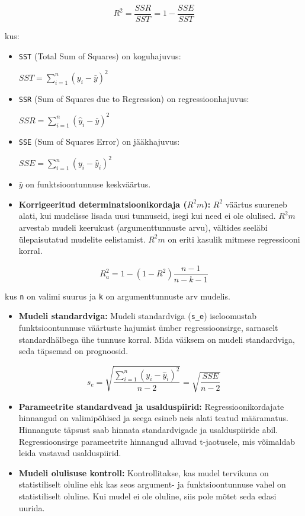 \documentclass[
]{book}
\providecommand{\tightlist}{%
  \setlength{\itemsep}{0pt}\setlength{\parskip}{0pt}}
\theoremstyle{definition}
\theoremstyle{definition}
\theoremstyle{definition}
\theoremstyle{definition}
\theoremstyle{remark}
\begin{document}
\[R^2 = \frac{SSR}{SST} = 1 - \frac{SSE}{SST}\]

kus:

\begin{itemize}
\item
  \texttt{SST} (Total Sum of Squares) on koguhajuvus:

  \(SST = \sum_{i=1}^{n}(y_i - \bar{y})^2\)
\item
  \texttt{SSR} (Sum of Squares due to Regression) on regressioonhajuvus:

  \(SSR = \sum_{i=1}^{n}(\hat{y}_i - \bar{y})^2\)
\item
  \texttt{SSE} (Sum of Squares Error) on jääkhajuvus:

  \(SSE = \sum_{i=1}^{n}(y_i - \hat{y}_i)^2\)
\item
  \(\bar{y}\) on funktsioontunnuse keskväärtus.
\item
  \textbf{Korrigeeritud determinatsioonikordaja (\(R^2m\)):} \(R^2\) väärtus suureneb alati, kui mudelisse lisada uusi tunnuseid, isegi kui need ei ole olulised. \(R^2m\) arvestab mudeli keerukust (argumenttunnuste arvu), vältides seeläbi ülepaisutatud mudelite eelistamist. \(R^2m\) on eriti kasulik mitmese regressiooni korral.
\end{itemize}

\[R^2_a = 1 - (1-R^2) \frac{n-1}{n-k-1}\]

kus \texttt{n} on valimi suurus ja \texttt{k} on argumenttunnuste arv mudelis.

\begin{itemize}
\tightlist
\item
  \textbf{Mudeli standardviga:} Mudeli standardviga (\texttt{s\_e}) iseloomustab funktsioontunnuse väärtuste hajumist ümber regressioonsirge, sarnaselt standardhälbega ühe tunnuse korral. Mida väiksem on mudeli standardviga, seda täpsemad on prognoosid.
\end{itemize}

\[s_e = \sqrt{\frac{\sum_{i=1}^{n}(y_i - \hat{y}_i)^2}{n-2}} = \sqrt{\frac{SSE}{n-2}}\]

\begin{itemize}
\tightlist
\item
  \textbf{Parameetrite standardvead ja usalduspiirid:} Regressioonikordajate hinnangud on valimipõhised ja seega esineb neis alati teatud määramatus. Hinnangute täpsust saab hinnata standardvigade ja usalduspiiride abil. Regressioonsirge parameetrite hinnangud alluvad t-jaotusele, mis võimaldab leida vastavad usalduspiirid.
\item
  \textbf{Mudeli olulisuse kontroll:} Kontrollitakse, kas mudel tervikuna on statistiliselt oluline ehk kas seos argument- ja funktsioontunnuse vahel on statistiliselt oluline. Kui mudel ei ole oluline, siis pole mõtet seda edasi uurida.
\end{itemize}
\end{document}
